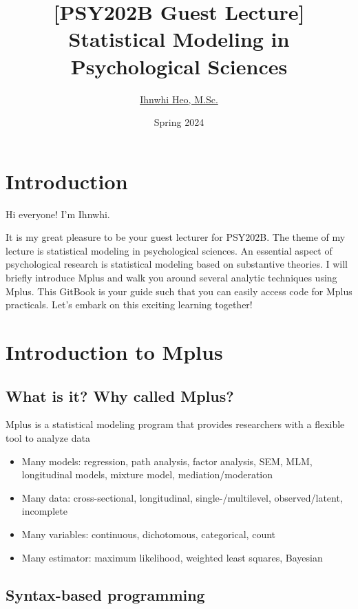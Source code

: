 \documentclass[
]{book}
\title{{[}PSY202B Guest Lecture{]} Statistical Modeling in Psychological Sciences}
\author{\href{https://ihnwhiheo.github.io/}{Ihnwhi Heo, M.Sc.}}
\date{Spring 2024}
\begin{document}
\maketitle

{
\setcounter{tocdepth}{1}
\tableofcontents
}
\hypertarget{introduction}{%
\chapter{Introduction}\label{introduction}}

Hi everyone! I'm Ihnwhi.

It is my great pleasure to be your guest lecturer for PSY202B. The theme of my lecture is statistical modeling in psychological sciences. An essential aspect of psychological research is statistical modeling based on substantive theories. I will briefly introduce Mplus and walk you around several analytic techniques using Mplus. This GitBook is your guide such that you can easily access code for Mplus practicals. Let's embark on this exciting learning together!

\hypertarget{introduction-to-mplus}{%
\chapter{Introduction to Mplus}\label{introduction-to-mplus}}

\hypertarget{what-is-it-why-called-mplus}{%
\section{What is it? Why called Mplus?}\label{what-is-it-why-called-mplus}}

Mplus is a statistical modeling program that provides researchers with a flexible tool to analyze data

\begin{itemize}
\item
  Many models: regression, path analysis, factor analysis, SEM, MLM, longitudinal models, mixture model, mediation/moderation
\item
  Many data: cross-sectional, longitudinal, single-/multilevel, observed/latent, incomplete
\item
  Many variables: continuous, dichotomous, categorical, count
\item
  Many estimator: maximum likelihood, weighted least squares, Bayesian
\end{itemize}

\hypertarget{syntax-based-programming}{%
\section{Syntax-based programming}\label{syntax-based-programming}}
\end{document}
